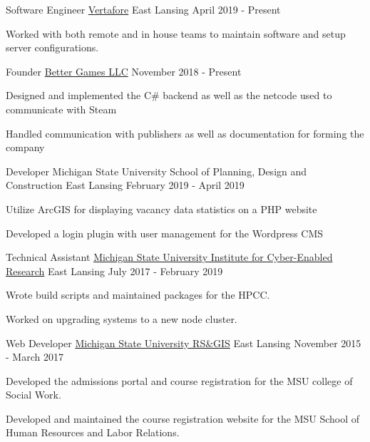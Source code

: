
\begin{cventries}

  \cventry
    {Software Engineer} %
    {\href{https://www.vertafore.com}{Vertafore}} %
    {East Lansing} %
    {April 2019 - Present} %
    {
      \begin{cvitems}
        \item {Worked with both remote and in house teams to maintain software and setup server configurations.}
      \end{cvitems}
    }

  \cventry
    {Founder}
    {\href{https://better-games.org}{Better Games LLC}}
    {}
    {November 2018 - Present}
    {
      \begin{cvitems}
        \item {Designed and implemented the C\# backend as well as the netcode used to communicate with Steam}
        \item {Handled communication with publishers as well as documentation for forming the company}
      \end{cvitems}
    }

  \cventry
  {Developer}
  {Michigan State University School of Planning, Design and Construction}
  {East Lansing}
  {February 2019 - April 2019}
  {
    \begin{cvitems}
      \item {Utilize ArcGIS for displaying vacancy data statistics on a PHP website}
      \item {Developed a login plugin with user management for the Wordpress CMS}
    \end{cvitems}
  }

  \cventry
    {Technical Assistant}
    {\href{https://icer.msu.edu}{Michigan State University Institute for Cyber-Enabled Research}}
    {East Lansing}
    {July 2017 - February 2019}
    {
      \begin{cvitems}
        \item {Wrote build scripts and maintained packages for the HPCC.}
        \item {Worked on upgrading systems to a new node cluster.}
      \end{cvitems}
    }

  \cventry
    {Web Developer}
    {\href{http://www.rsgis.msu.edu}{Michigan State University RS\&GIS}}
    {East Lansing}
    {November 2015 - March 2017}
    {
      \begin{cvitems}
        \item {Developed the admissions portal and course registration for the MSU college of Social Work.}
        \item {Developed and maintained the course registration website for the MSU School of Human Resources and Labor Relations.}
      \end{cvitems}
    }


\end{cventries}
